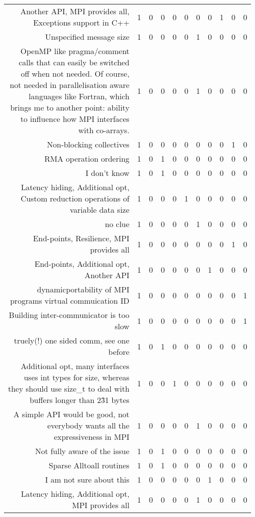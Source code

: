 {\begin{landscape}
\begin{longtable}[htb]{r|c|c|c|c|c|c|c|c|c|c}
{Another API, MPI provides all, Exceptions support in C++} & 1 & 0 & 0 & 0 & 0 & 0 & 0 & 1 & 0 & 0 \\%
{Unspecified message size} & 1 & 0 & 0 & 0 & 0 & 1 & 0 & 0 & 0 & 0 \\%
{OpenMP like pragma/comment calls that can easily be switched off when not needed. Of course, not needed in parallelisation aware languages like Fortran, which brings me to another point: ability to influence how MPI interfaces with co-arrays.} & 1 & 0 & 0 & 0 & 0 & 1 & 0 & 0 & 0 & 0 \\%
{Non-blocking collectives} & 1 & 0 & 0 & 0 & 0 & 0 & 0 & 0 & 1 & 0 \\%
{RMA operation ordering} & 1 & 0 & 1 & 0 & 0 & 0 & 0 & 0 & 0 & 0 \\%
{I don't know} & 1 & 0 & 1 & 0 & 0 & 0 & 0 & 0 & 0 & 0 \\%
{Latency hiding, Additional opt, Custom reduction operations of variable data size} & 1 & 0 & 0 & 0 & 1 & 0 & 0 & 0 & 0 & 0 \\%
{no clue} & 1 & 0 & 0 & 0 & 0 & 1 & 0 & 0 & 0 & 0 \\%
{End-points, Resilience, MPI provides all} & 1 & 0 & 0 & 0 & 0 & 0 & 0 & 0 & 1 & 0 \\%
{End-points, Additional opt, Another API} & 1 & 0 & 0 & 0 & 0 & 0 & 1 & 0 & 0 & 0 \\%
{dynamicportability of MPI programs virtual commuication ID} & 1 & 0 & 0 & 0 & 0 & 0 & 0 & 0 & 0 & 1 \\%
{Building inter-communicator is too slow} & 1 & 0 & 0 & 0 & 0 & 0 & 0 & 0 & 0 & 1 \\%
{truely(!) one sided comm, see one before} & 1 & 0 & 1 & 0 & 0 & 0 & 0 & 0 & 0 & 0 \\%
{Additional opt, many interfaces uses int types for size, whereas they should use size\_t to deal with buffers longer than 2\^31 bytes} & 1 & 0 & 0 & 1 & 0 & 0 & 0 & 0 & 0 & 0 \\%
{A simple API would be good, not everybody wants all the expressiveness in MPI} & 1 & 0 & 0 & 0 & 0 & 1 & 0 & 0 & 0 & 0 \\%
{Not fully aware of the issue} & 1 & 0 & 1 & 0 & 0 & 0 & 0 & 0 & 0 & 0 \\%
{Sparse Alltoall routines} & 1 & 0 & 1 & 0 & 0 & 0 & 0 & 0 & 0 & 0 \\%
{I am not sure about this} & 1 & 0 & 0 & 0 & 0 & 0 & 1 & 0 & 0 & 0 \\%
{Latency hiding, Additional opt, MPI provides all} & 1 & 0 & 0 & 0 & 0 & 1 & 0 & 0 & 0 & 0 \\%

\end{longtable}
\end{landscape}}
